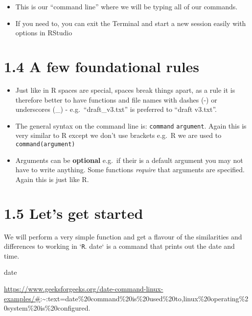 \documentclass[
]{book}
\newenvironment{Shaded}{\begin{snugshade}}{\end{snugshade}}
\newcommand{\FunctionTok}[1]{\textcolor[rgb]{0.00,0.00,0.00}{#1}}
\begin{document}
\begin{itemize}
\item
  This is our ``command line'' where we will be typing all of our commands.
\item
  If you need to, you can exit the Terminal and start a new session easily with options in RStudio
\end{itemize}

\hypertarget{a-few-foundational-rules}{%
\section{1.4 A few foundational rules}\label{a-few-foundational-rules}}

\begin{itemize}
\item
  Just like in R spaces are special, spaces break things apart, as a rule it is therefore better to have functions and file names with dashes (-) or underscores (\_) - e.g.~``draft\_v3.txt'' is preferred to ``draft v3.txt''.
\item
  The general syntax on the command line is: \texttt{command} \texttt{argument}. Again this is very similar to R except we don't use brackets e.g.~R we are used to \texttt{command(argument)}
\item
  Arguments can be \textbf{optional} e.g.~if their is a default argument you may not have to write anything. Some functions \emph{require} that arguments are specified. Again this is just like R.
\end{itemize}

\hypertarget{lets-get-started}{%
\section{1.5 Let's get started}\label{lets-get-started}}

We will perform a very simple function and get a flavour of the similarities and differences to working in `\texttt{R}. date` is a command that prints out the date and time.

\begin{Shaded}
\begin{Highlighting}[]
    \FunctionTok{date}
\end{Highlighting}
\end{Shaded}

\url{https://www.geeksforgeeks.org/date-command-linux-examples/\#}:\textasciitilde:text=date\%20command\%20is\%20used\%20to,linux\%20operating\%20system\%20is\%20configured.
\end{document}
